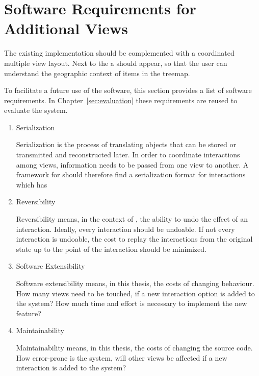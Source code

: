 \section{Software Requirements for Additional Views}\label{sec:analysis:requirements}
The existing implementation should be complemented with a coordinated multiple view layout.
Next to the \tmap{} a \gv{} should appear, so that the user can understand the geographic context of items in the treemap.

To facilitate a future use of the software, this section provides a list of software requirements.
In Chapter~\ref{sec:evaluation} these requirements are reused to evaluate the system.

\begin{enumerate}
  \item Serialization

    Serialization is the process of translating objects that can be stored or transmitted and reconstructed later.
    In order to coordinate interactions among views, information needs to be passed from one view to another.
    A framework for \cmvs{} should therefore find a serialization format for interactions which has

  \item Reversibility

  Reversibility means, in the context of \cmvs{}, the ability to undo the effect of an interaction.
  Ideally, every interaction should be undoable.
  If not every interaction is undoable, the cost to replay the interactions from the original state up to the point of the interaction should be minimized.

\item Software Extensibility

  Software extensibility means, in this thesis, the costs of changing behaviour.
  How many views need to be touched, if a new interaction option is added to the system?
  How much time and effort is necessary to implement the new feature?

\item Maintainability

  Maintainability means, in this thesis, the costs of changing the source code.
  How error-prone is the system, will other views be affected if a new interaction is added to the system?

\end{enumerate}



